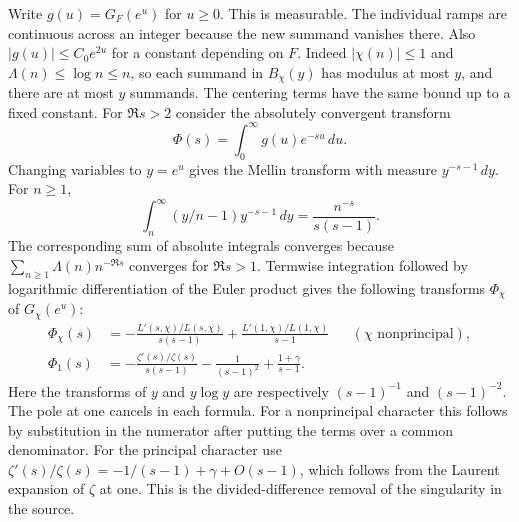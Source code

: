 Write \(g(u)=G_F(e^u)\) for \(u\geq0\). This is measurable. The individual
ramps are continuous across an integer because the new summand vanishes
there. Also \(|g(u)|\leq C_0e^{2u}\) for a constant depending on \(F\).
Indeed \(|\chi(n)|\leq1\) and \(\Lambda(n)\leq\log n\leq n\), so each
summand in \(B_\chi(y)\) has modulus at most \(y\), and there are at most
\(y\) summands. The centering terms have the same bound up to a fixed
constant. For \(\Re s>2\) consider the absolutely convergent transform
\[
 \Phi(s)=\int_0^\infty g(u)e^{-su}\,du .
\]
Changing variables to \(y=e^u\) gives the Mellin transform with measure
\(y^{-s-1}\,dy\). For \(n\geq1\),
\[
 \int_n^\infty (y/n-1)y^{-s-1}\,dy
       =\frac{n^{-s}}{s(s-1)} .
\]
The corresponding sum of absolute integrals converges because
\(\sum_{n\geq1}\Lambda(n)n^{-\Re s}\) converges for \(\Re s>1\).
Termwise integration followed by logarithmic differentiation of the
Euler product gives the following transforms \(\Phi_\chi\) of
\(G_\chi(e^u)\):
\begin{align*}
 \Phi_\chi(s)
 &=-\frac{L'(s,\chi)/L(s,\chi)}{s(s-1)}
          +\frac{L'(1,\chi)/L(1,\chi)}{s-1}
             &&(\chi\text{ nonprincipal}),\\
 \Phi_1(s)
 &=-\frac{\zeta'(s)/\zeta(s)}{s(s-1)}
          -\frac{1}{(s-1)^2}+\frac{1+\gamma}{s-1}.
\end{align*}
Here the transforms of \(y\) and \(y\log y\) are respectively
\((s-1)^{-1}\) and \((s-1)^{-2}\). The pole at one cancels in each
formula. For a nonprincipal character this follows by substitution
in the numerator after putting the terms over a common denominator.
For the principal character use
\(\zeta'(s)/\zeta(s)=-1/(s-1)+\gamma+O(s-1)\), which follows from the
Laurent expansion of \(\zeta\) at one. This is the divided-difference
removal of the singularity in the source.

